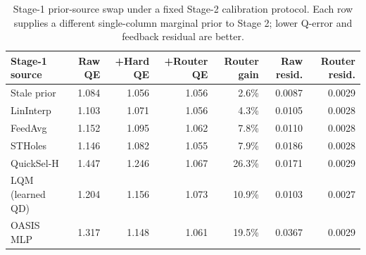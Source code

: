 \begin{table}[t]
  \centering
  \small
  \caption{Stage-1 prior-source swap under a fixed Stage-2 calibration protocol. Each row supplies a different single-column marginal prior to Stage 2; lower Q-error and feedback residual are better.}
  \label{tab:stage1_estimator_swap}
  \setlength{\tabcolsep}{4pt}
  \begin{tabular}{lrrrrrr}
    \toprule
    Stage-1 source & Raw QE & +Hard QE & +Router QE & Router gain & Raw resid. & Router resid. \\
    \midrule
    Stale prior & 1.084 & 1.056 & 1.056 & 2.6\% & 0.0087 & 0.0029 \\
    LinInterp & 1.103 & 1.071 & 1.056 & 4.3\% & 0.0105 & 0.0028 \\
    FeedAvg & 1.152 & 1.095 & 1.062 & 7.8\% & 0.0110 & 0.0028 \\
    STHoles & 1.146 & 1.082 & 1.055 & 7.9\% & 0.0186 & 0.0028 \\
    QuickSel-H & 1.447 & 1.246 & 1.067 & 26.3\% & 0.0171 & 0.0029 \\
    LQM (learned QD) & 1.204 & 1.156 & 1.073 & 10.9\% & 0.0103 & 0.0027 \\
    OASIS MLP & 1.317 & 1.148 & 1.061 & 19.5\% & 0.0367 & 0.0029 \\
    \bottomrule
  \end{tabular}
\end{table}
